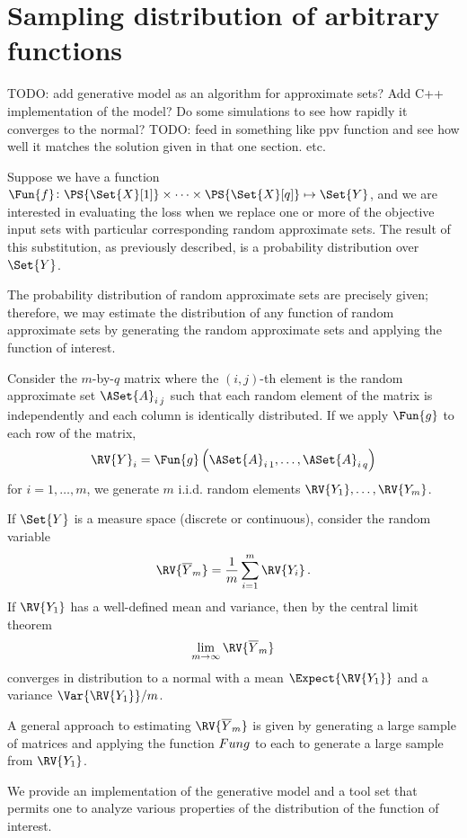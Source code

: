 \documentclass[ ../main.tex]{subfiles}
\begin{document}
{\section{Sampling distribution of arbitrary functions}
\label{app:samp}
TODO: add generative model as an algorithm for approximate sets? Add C++ implementation of the model? Do some simulations to see how rapidly it converges to the normal?
TODO: feed in something like ppv function and see how well it matches the solution given in that one section. etc.

Suppose we have a function $\Fun{f} \colon \PS{\Set{X}[1]} \times \cdots \times \PS{\Set{X}[q]} \mapsto \Set{Y}$, and we are interested in evaluating the loss when we replace one or more of the objective input sets with particular corresponding random approximate sets.
The result of this substitution, as previously described, is a probability distribution over $\Set{Y}$.

The probability distribution of random approximate sets are precisely given; therefore, we may estimate the distribution of any function of random approximate sets by generating the random approximate sets and applying the function of interest.

Consider the $m$-by-$q$ matrix where the $(i,j)$-th element is the random approximate set $\ASet{A}_{i\,j}$ such that each random element of the matrix is independently and each column is identically distributed.
If we apply $\Fun{g}$ to each row of the matrix,
\begin{equation}
\RV{Y}_i = \Fun{g}\left(\ASet{A}_{i\,1},\ldots,\ASet{A}_{i\,q}\right)
\end{equation}
for $i=1,\ldots,m$, we generate $m$ i.i.d. random elements $\RV{Y_1},\ldots,\RV{Y_m}$.

If $\Set{Y}$ is a measure space (discrete or continuous), consider the random variable
\begin{equation}
\RV{\overline{Y}_m} = \frac{1}{m} \sum_{i=1}^{m} \RV{Y_i}\,.
\end{equation}
If $\RV{Y_1}$ has a well-defined mean and variance, then by the central limit theorem
\begin{equation}
\lim_{m \to \infty} \RV{\overline{Y}_m}
\end{equation}
converges in distribution to a normal with a mean $\Expect{\RV{Y_1}}$ and a variance $\Var{\RV{Y_1}} / m$.

A general approach to estimating $\RV{\overline{Y}_m}$ is given by generating a large sample of matrices and applying the function $\\Fun{g}$ to each to generate a large sample from $\RV{Y_1}$.

We provide an implementation of the generative model and a tool set that permits one to analyze various properties of the distribution of the function of interest.
}
\end{document}
